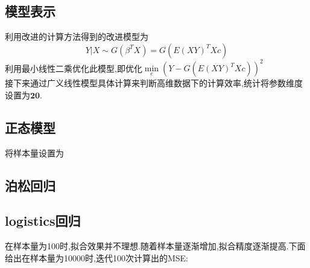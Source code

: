 \subsection{模型表示}
利用改进的计算方法得到的改进模型为
$$ Y|X \sim G(\beta^T X) = G(E(XY)^TXc)$$
利用最小线性二乘优化此模型,即优化$\min\limits_{c} (Y-G(E(XY)^TXc))^2$\\
接下来通过广义线性模型具体计算来判断高维数据下的计算效率,统计将参数维度设置为$\textbf{20}$.

\subsection{正态模型}
将样本量设置为


\subsection{泊松回归}

\subsection{logistics回归}

在样本量为100时,拟合效果并不理想.随着样本量逐渐增加,拟合精度逐渐提高.下面给出在样本量为10000时,迭代100次计算出的MSE: